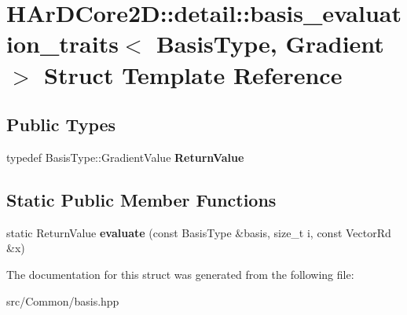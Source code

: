 \hypertarget{structHArDCore2D_1_1detail_1_1basis__evaluation__traits_3_01BasisType_00_01Gradient_01_4}{}\section{H\+Ar\+D\+Core2D\+:\+:detail\+:\+:basis\+\_\+evaluation\+\_\+traits$<$ Basis\+Type, Gradient $>$ Struct Template Reference}
\label{structHArDCore2D_1_1detail_1_1basis__evaluation__traits_3_01BasisType_00_01Gradient_01_4}
\subsection*{Public Types}
\begin{DoxyCompactItemize}
\item 
\mbox{\label{structHArDCore2D_1_1detail_1_1basis__evaluation__traits_3_01BasisType_00_01Gradient_01_4_a5b10153f3e7e528d4e6508694d4bbea7}} 
typedef Basis\+Type\+::\+Gradient\+Value {\bfseries Return\+Value}
\end{DoxyCompactItemize}
\subsection*{Static Public Member Functions}
\begin{DoxyCompactItemize}
\item 
\mbox{\label{structHArDCore2D_1_1detail_1_1basis__evaluation__traits_3_01BasisType_00_01Gradient_01_4_afb1c26e922916f159b9e1eb123a0b53a}} 
static Return\+Value {\bfseries evaluate} (const Basis\+Type \&basis, size\+\_\+t i, const Vector\+Rd \&x)
\end{DoxyCompactItemize}


The documentation for this struct was generated from the following file\+:\begin{DoxyCompactItemize}
\item 
src/\+Common/basis.\+hpp\end{DoxyCompactItemize}
